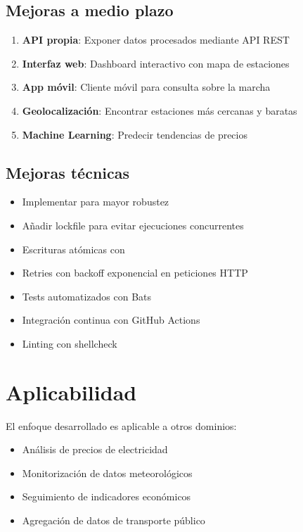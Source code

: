 \subsection{Mejoras a medio plazo}

\begin{enumerate}
  \item \textbf{API propia}: Exponer datos procesados mediante API REST

  \item \textbf{Interfaz web}: Dashboard interactivo con mapa de estaciones

  \item \textbf{App móvil}: Cliente móvil para consulta sobre la marcha

  \item \textbf{Geolocalización}: Encontrar estaciones más cercanas y baratas

  \item \textbf{Machine Learning}: Predecir tendencias de precios
\end{enumerate}

\subsection{Mejoras técnicas}

\begin{itemize}
  \item Implementar  para mayor robustez
  \item Añadir lockfile para evitar ejecuciones concurrentes
  \item Escrituras atómicas con 
  \item Retries con backoff exponencial en peticiones HTTP
  \item Tests automatizados con Bats
  \item Integración continua con GitHub Actions
  \item Linting con shellcheck
\end{itemize}

\section{Aplicabilidad}

El enfoque desarrollado es aplicable a otros dominios:

\begin{itemize}
  \item Análisis de precios de electricidad
  \item Monitorización de datos meteorológicos
  \item Seguimiento de indicadores económicos
  \item Agregación de datos de transporte público
\end{itemize}


